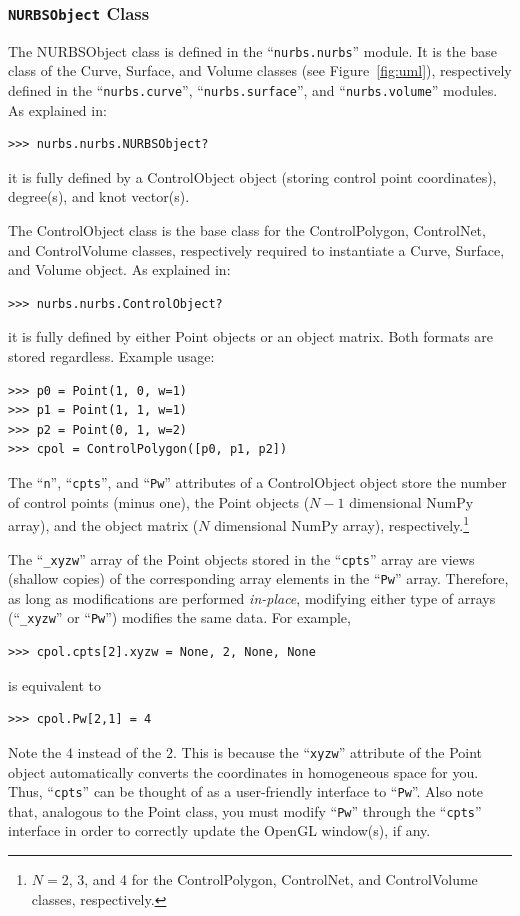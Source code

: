 \documentclass[]{article}
\begin{document}
\subsubsection{\texttt{NURBSObject} Class}
\label{subsubsec:nurbsobject}

The NURBSObject class is defined in the ``\texttt{nurbs.nurbs}'' module.  
It is the base class of the Curve, Surface, and Volume classes (see 
Figure~\ref{fig:uml}), respectively defined in the 
``\texttt{nurbs.curve}'', ``\texttt{nurbs.surface}'', and 
``\texttt{nurbs.volume}'' modules.  As explained in:
\begin{verbatim}
>>> nurbs.nurbs.NURBSObject?
\end{verbatim}
it is fully defined by a ControlObject object (storing control point 
coordinates), degree(s), and knot vector(s).

The ControlObject class is the base class for the ControlPolygon, 
ControlNet, and ControlVolume classes, respectively required to 
instantiate a Curve, Surface, and Volume object.  As explained in:
\begin{verbatim}
>>> nurbs.nurbs.ControlObject?
\end{verbatim}
it is fully defined by either Point objects or an object matrix.  Both 
formats are stored regardless.  Example usage:
\begin{verbatim}
>>> p0 = Point(1, 0, w=1)
>>> p1 = Point(1, 1, w=1)
>>> p2 = Point(0, 1, w=2)
>>> cpol = ControlPolygon([p0, p1, p2])
\end{verbatim}
The ``\texttt{n}'', ``\texttt{cpts}'', and ``\texttt{Pw}'' attributes of 
a ControlObject object store the number of control points (minus one), 
the Point objects ($N-1$ dimensional NumPy array), and the object matrix 
($N$ dimensional NumPy array), respectively.\footnote{$N = 2$, 3, and 4 
for the ControlPolygon, ControlNet, and ControlVolume classes, 
respectively.}

The ``\texttt{\_xyzw}'' array of the Point objects stored in the 
``\texttt{cpts}'' array are views (shallow copies) of the corresponding 
array elements in the ``\texttt{Pw}'' array.  Therefore, as long as 
modifications are performed \emph{in-place}, modifying either type of 
arrays (``\texttt{\_xyzw}'' or ``\texttt{Pw}'') modifies the same data.  
For example,
\begin{verbatim}
>>> cpol.cpts[2].xyzw = None, 2, None, None
\end{verbatim}
is equivalent to
\begin{verbatim}
>>> cpol.Pw[2,1] = 4
\end{verbatim}
Note the $4$ instead of the $2$.  This is because the ``\texttt{xyzw}'' 
attribute of the Point object automatically converts the coordinates in 
homogeneous space for you.  Thus, ``\texttt{cpts}'' can be thought of as 
a user-friendly interface to ``\texttt{Pw}''.  Also note that, analogous 
to the Point class, you must modify ``\texttt{Pw}'' through the 
``\texttt{cpts}'' interface in order to correctly update the OpenGL 
window(s), if any.
\end{document}
